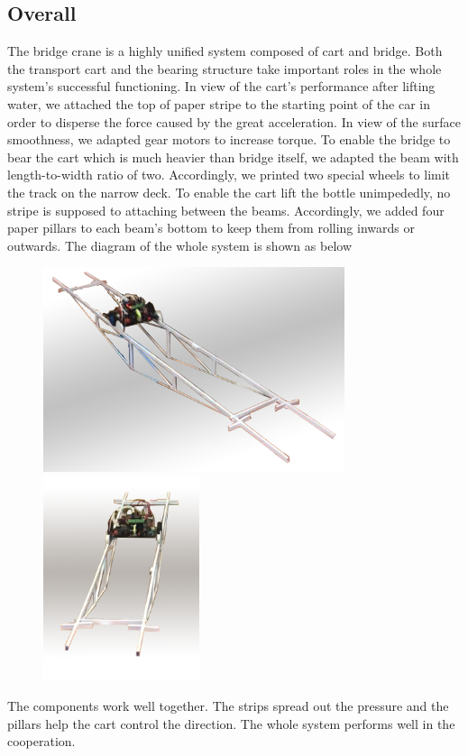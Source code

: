 \subsection{Overall}

The bridge crane is a highly unified system composed of cart and bridge. Both the transport cart and the bearing structure take important roles in the whole system’s successful functioning.
In view of the cart’s performance after lifting water, we attached the top of paper stripe to the starting point of the car in order to disperse the force caused by the great acceleration. In view of the surface smoothness, we adapted gear motors to increase torque.
To enable the bridge to bear the cart which is much heavier than bridge itself, we adapted the beam with length-to-width ratio of two. Accordingly, we printed two special wheels to limit the track on the narrow deck. To enable the cart lift the bottle unimpededly, no stripe is supposed to attaching between the beams. Accordingly, we added four paper pillars to each beam’s bottom to keep them from rolling inwards or outwards. 
The diagram of the whole system is shown as below

\begin{figure}[H]
\begin{center}
\includegraphics[height=6cm]{figure/designOverview/overallll}
\includegraphics[height=6cm]{figure/designOverview/overallb}
\end{center}
\end{figure}

The components work well together. The strips spread out the pressure and the pillars help the cart control the direction. The whole system performs well in the cooperation.
		